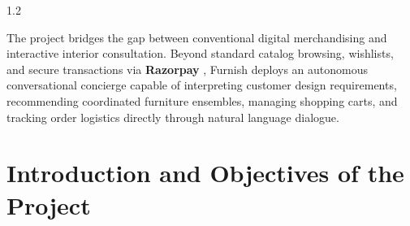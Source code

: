 \documentclass[12pt,a4paper]{article}
\begin{document}
{\begin{spacing}{1.2}
\vspace{0.10in}

\noindent
The project bridges the gap between conventional digital merchandising and interactive interior consultation. Beyond standard catalog browsing, wishlists, and secure transactions via \textbf{Razorpay} , Furnish deploys an autonomous conversational concierge capable of interpreting customer design requirements, recommending coordinated furniture ensembles, managing shopping carts, and tracking order logistics directly through natural language dialogue.

\end{spacing}
}

\vfill

\newpage



\section{Introduction and Objectives of the Project}

\vspace{0.10in}
\end{document}
